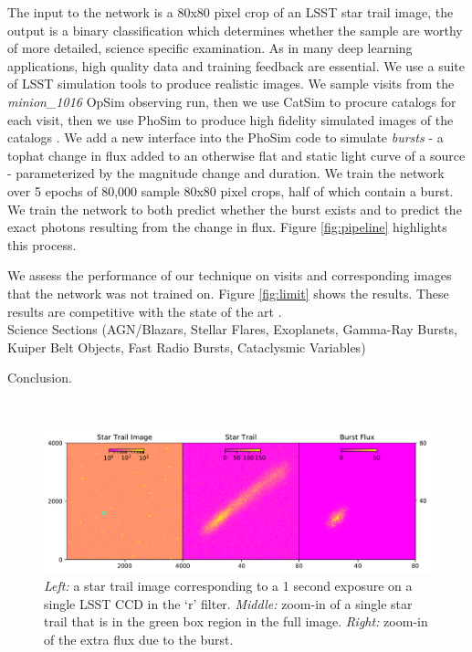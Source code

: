 \documentclass[12pt, letterpaper]{article}
\begin{document}
The input to the network is a 80x80 pixel crop of an LSST star trail image, the output is a binary classification which determines whether the sample are worthy of more detailed, science specific examination. As in many deep learning applications, high quality data and training feedback are essential. We use a suite of LSST simulation tools to produce realistic images. We sample visits from the \textit{minion\_1016} OpSim observing run, then we use CatSim to procure catalogs for each visit, then we use PhoSim to produce high fidelity simulated images of the catalogs \citep{2014SPIE.9150E..15D,2014SPIE.9150E..14C,2015ApJS..218...14P}. We add a new interface into the PhoSim code to simulate \textit{bursts} - a tophat change in flux added to an otherwise flat and static light curve of a source - parameterized by the magnitude change and duration. We train the network over 5 epochs of 80,000 sample 80x80 pixel crops, half of which contain a burst. We train the network to both predict whether the burst exists and to predict the exact photons resulting from the change in flux. Figure \ref{fig:pipeline} highlights this process. 

We assess the performance of our technique on visits and corresponding images that the network was not trained on. Figure \ref{fig:limit} shows the results. These results are competitive with the state of the art \citep{2016SPIE.9908E..0YD}. 
\\

{\color{green}
Science Sections (AGN/Blazars, Stellar Flares, Exoplanets, Gamma-Ray Bursts, Kuiper Belt Objects, Fast Radio Bursts, Cataclysmic Variables)
}

{\color{green}Conclusion.}

\
\begin{figure}[htb]
\center
\includegraphics[width=1.00\columnwidth]{star_trail.pdf}
\caption{\textit{Left:} a star trail image corresponding to a 1 second exposure on a single LSST CCD in the `r' filter. \textit{Middle:} zoom-in of a single star trail that is in the green box region in the full image. \textit{Right:} zoom-in of the extra flux due to the burst.}
\label{fig:trail}
\end{figure}
\end{document}
